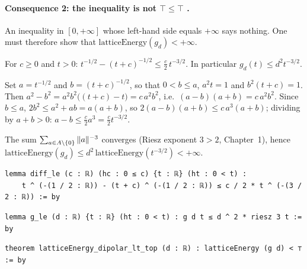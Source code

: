 \paragraph{Consequence 2: the inequality is not $\top\le\top$ \tierA.} An inequality in $[0,+\infty]$ whose left-hand
side equals $+\infty$ says nothing. One must therefore show that $\mathrm{latticeEnergy}(g_d)<+\infty$.
\begin{lemma}\label{ch2:lem:diffle}
For $c\ge0$ and $t>0$: $t^{-1/2}-(t+c)^{-1/2}\le\frac c2\,t^{-3/2}$. In particular $g_d(t)\le d^2t^{-3/2}$.
\end{lemma}
\begin{humanproof}
Set $a=t^{-1/2}$ and $b=(t+c)^{-1/2}$, so that $0<b\le a$, $a^2t=1$ and $b^2(t+c)=1$. Then
$a^2-b^2=a^2b^2\bigl((t+c)-t\bigr)=c\,a^2b^2$, i.e.\ $(a-b)(a+b)=c\,a^2b^2$. Since $b\le a$, $2b^2\le a^2+ab=a(a+b)$, so
$2(a-b)(a+b)\le c\,a^3(a+b)$; dividing by $a+b>0$: $a-b\le\frac c2a^3=\frac c2t^{-3/2}$.
\end{humanproof}
\noindent The sum $\sum_{a\in A\setminus\{0\}}\|a\|^{-3}$ converges (Riesz exponent $3>2$, Chapter~1), hence
$\mathrm{latticeEnergy}(g_d)\le d^2\,\mathrm{latticeEnergy}(t^{-3/2})<+\infty$.
\begin{leanbox}
\begin{lstlisting}[style=chdeux]
lemma diff_le (c : ℝ) (hc : 0 ≤ c) {t : ℝ} (ht : 0 < t) :
    t ^ (-(1 / 2 : ℝ)) - (t + c) ^ (-(1 / 2 : ℝ)) ≤ c / 2 * t ^ (-(3 / 2 : ℝ)) := by
\end{lstlisting}
\begin{lstlisting}[style=chdeux]
lemma g_le (d : ℝ) {t : ℝ} (ht : 0 < t) : g d t ≤ d ^ 2 * riesz 3 t := by
\end{lstlisting}
\begin{lstlisting}[style=chdeux]
theorem latticeEnergy_dipolar_lt_top (d : ℝ) : latticeEnergy (g d) < ⊤ := by
\end{lstlisting}
\end{leanbox}

